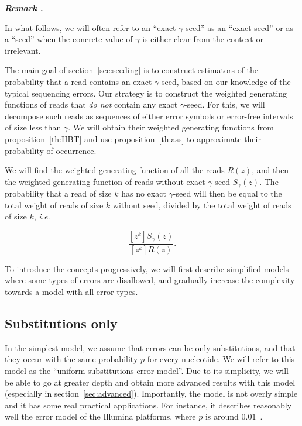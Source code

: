 \documentclass{article}
\newcounter{remarkcounter}
\newenvironment{remark}
{\small\it\vspace{0.5\baselineskip}
  \refstepcounter{remarkcounter}%
  \noindent\textbf{Remark \arabic{remarkcounter}.}%
}{\vspace{0.5\baselineskip}}
\begin{document}
\begin{remark}
In what follows, we will often refer to an ``exact $\gamma$-seed'' as an
``exact seed'' or as a ``seed'' when the concrete value of $\gamma$ is
either clear from the context or irrelevant.
\end{remark}

The main goal of section~\ref{sec:seeding} is to construct estimators of
the probability that a read contains an exact  $\gamma$-seed, based on our
knowledge of the typical sequencing errors. Our strategy is to construct
the weighted generating functions of reads that \emph{do not} contain any
exact $\gamma$-seed. For this, we will decompose such reads as sequences
of either error symbols or error-free intervals of size less than
$\gamma$. We will obtain their weighted generating functions from
proposition~\ref{th:HBT} and use proposition~\ref{th:ass} to approximate
their probability of occurrence.

We will find the weighted generating function of all the reads $R(z)$, and
then the weighted generating function of reads without exact
$\gamma$-seed $S_\gamma(z)$. The probability that a read of size $k$ has
no exact $\gamma$-seed will then be equal to the total weight of reads of
size $k$ without seed, divided by the total weight of reads of size $k$,
\textit{i.e.}

\begin{equation}
\label{eq:THEratio}
\frac{[z^k]S_\gamma(z)}{[z^k]R(z)}.
\end{equation}

To introduce the concepts progressively, we will first describe simplified
models where some types of errors are disallowed, and gradually
increase the complexity towards a model with all error types.






\subsection{Substitutions only}
\label{sec:substitutions}

In the simplest model, we assume that errors can be only substitutions,
and that they occur with the same probability $p$ for every nucleotide. We
will refer to this model as the ``uniform substitutions error model''. Due
to its simplicity, we will be able to go at greater depth and obtain more
advanced results with this model (especially in
section~\ref{sec:advanced}). Importantly, the model is not overly simple
and it has some real practical applications. For instance, it describes
reasonably well the error model of the Illumina platforms, where $p$ is
around $0.01$~\cite{pmid21576222}.
\end{document}

